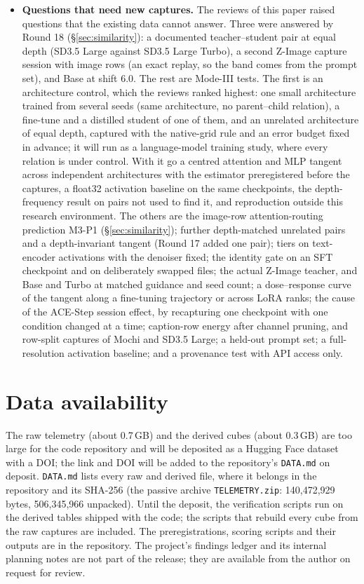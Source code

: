 \documentclass[11pt]{article}
\begin{document}
\begin{itemize}
 \item \textbf{Questions that need new captures.} The reviews of this paper raised questions that the existing data cannot answer. Three were answered by Round 18 (\S\ref{sec:similarity}): a documented teacher--student pair at equal depth (SD3.5 Large against SD3.5 Large Turbo), a second Z-Image capture session with image rows (an exact replay, so the band comes from the prompt set), and Base at shift $6.0$. The rest are Mode-III tests. The first is an architecture control, which the reviews ranked highest: one small architecture trained from several seeds (same architecture, no parent--child relation), a fine-tune and a distilled student of one of them, and an unrelated architecture of equal depth, captured with the native-grid rule and an error budget fixed in advance; it will run as a language-model training study, where every relation is under control. With it go a centred attention and MLP tangent across independent architectures with the estimator preregistered before the captures, a float32 activation baseline on the same checkpoints, the depth-frequency result on pairs not used to find it, and reproduction outside this research environment. The others are the image-row attention-routing prediction M3-P1 (\S\ref{sec:similarity}); further depth-matched unrelated pairs and a depth-invariant tangent (Round 17 added one pair); tiers on text-encoder activations with the denoiser fixed; the identity gate on an SFT checkpoint and on deliberately swapped files; the actual Z-Image teacher, and Base and Turbo at matched guidance and seed count; a dose--response curve of the tangent along a fine-tuning trajectory or across LoRA ranks; the cause of the ACE-Step session effect, by recapturing one checkpoint with one condition changed at a time; caption-row energy after channel pruning, and row-split captures of Mochi and SD3.5 Large; a held-out prompt set; a full-resolution activation baseline; and a provenance test with API access only.
\end{itemize}

\section*{Data availability}
The raw telemetry (about 0.7\,GB) and the derived cubes (about 0.3\,GB) are too large for the code repository and will be deposited as a Hugging Face dataset with a DOI; the link and DOI will be added to the repository's \texttt{DATA.md} on deposit. \texttt{DATA.md} lists every raw and derived file, where it belongs in the repository and its SHA-256 (the passive archive \texttt{TELEMETRY.zip}: 140{,}472{,}929 bytes, 506{,}345{,}966 unpacked). Until the deposit, the verification scripts run on the derived tables shipped with the code; the scripts that rebuild every cube from the raw captures are included. The preregistrations, scoring scripts and their outputs are in the repository. The project's findings ledger and its internal planning notes are not part of the release; they are available from the author on request for review.
\end{document}

